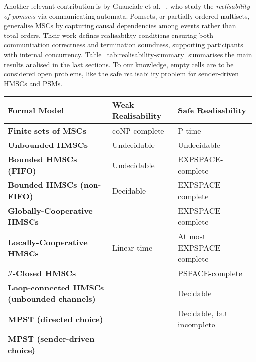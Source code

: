 Another relevant contribution is by Guanciale et al.~ 
\cite{DBLP:journals/jlap/GuancialeT19}, who study the 
\emph{realisability of pomsets} via communicating automata. 
Pomsets, or partially ordered multisets, generalise MSCs by 
capturing causal dependencies among events rather than total 
orders. Their work defines realisability conditions ensuring 
both communication correctness and termination soundness, 
supporting participants with internal concurrency.
Table~\ref{tab:realisability-summary} summarises the 
main results analised in the last sections. To our knowledge, 
empty cells are to be considered open problems, like
the safe realisability problem for sender-driven HMSCs
and PSMs.

\bigskip

\begin{table}[!ht]
\centering
\renewcommand{\arraystretch}{1.3}
\begin{tabular}{|p{4.3cm}|p{4.3cm}|p{4.3cm}|}
\hline
\textbf{Formal Model} & \textbf{Weak Realisability} & \textbf{Safe Realisability} \\ 
\hline
\textbf{Finite sets of MSCs} 
& coNP-complete~\cite{alur2005realizability} 
& P-time~\cite{alur2005realizability} \\ 
\hline
\textbf{Unbounded HMSCs} 
& Undecidable~\cite{lohrey2003realizability} 
& Undecidable~\cite{lohrey2003realizability} \\ 
\hline
\textbf{Bounded HMSCs (FIFO)} 
& Undecidable~\cite{alur2005realizability} 
& EXPSPACE-complete~\cite{lohrey2003realizability} \\ 
\hline
\textbf{Bounded HMSCs (non-FIFO)} 
& Decidable~\cite{morin2002recognizable} 
& EXPSPACE-complete~\cite{lohrey2003realizability} \\ 
\hline
\textbf{Globally-Cooperative HMSCs} 
& -- 
& EXPSPACE-complete~\cite{morin2002recognizable} \\ 
\hline
\textbf{Locally-Cooperative HMSCs} 
& Linear time~\cite{genest2006infinite}
& At most EXPSPACE-complete~\cite{morin2002recognizable}  \\ 
\hline
\textbf{$\mathcal{I}$-Closed HMSCs} 
& -- 
& PSPACE-complete~\cite{lohrey2003realizability} \\ 
\hline
\textbf{Loop-connected HMSCs (unbounded channels)} 
& -- 
& Decidable~\cite{bollig2025high} \\ 
\hline
\textbf{MPST (directed choice)} 
& --
& Decidable, but incomplete~\cite{honda2008multiparty} \\ 
\hline
\textbf{MPST (sender-driven choice)} 

\end{tabular}
\end{table}
